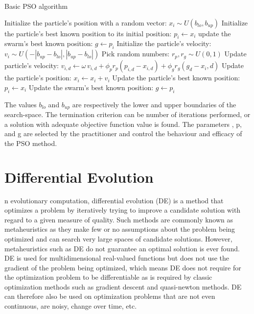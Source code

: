 \documentclass[11pt, a4paper]{report}
\begin{document}
\begin{algorithm}
	\caption{Basic PSO algorithm}\label{algo:pso}
	\begin{algorithmic}[1]
		\State Initialize the particle's position with a random vector: $ x_{i} \sim U(b_{lo}, b_{up}) $
		\State Initialize the particle's best known position to its initial position: $ p_{i} \gets x_{i} $
		\State update the swarm's best known  position: $ g \gets p_{i} $
		\EndIf
		\State Initialize the particle's velocity: $ v_{i} \sim  U(-|b_{up}-b_{lo}|, |b_{up}-b_{lo}|) $
		\State Pick random numbers: $ r_{p}, r_{g} \sim U(0,1) $
		\State          Update particle's velocity: $ v_{i,d} \gets \omega\, v_{i,d} + \phi_{p} r_{p} (p_{i,d}-x_{i,d}) + \phi_{g} r_{g} (g_{d}-x_{i},d) $
		\State Update the particle's position: $ x_{i} \gets x_{i} + v_{i} $
		\State Update the particle's best known position: $ p_{i} ← x_{i} $
		\State Update the swarm's best known position: $ g \gets p_{i} $
		\EndIf
		\EndIf
		\EndFor
		\EndFor
		\EndWhile
		\EndFor
	\end{algorithmic}
\end{algorithm}

The values $ b_{lo} $ and $ b_{up} $ are respectively the lower and upper boundaries of the search-space. The termination criterion can be number of iterations performed, or a solution with adequate objective function value is found. The parameters \omega, \phi p, and \phi g are selected by the practitioner and control the behaviour and efficacy of the PSO method. \cite{wiki:pso}
\newpage


\section{Differential Evolution}
n evolutionary computation, differential evolution (DE) is a method that optimizes a problem by iteratively trying to improve a candidate solution with regard to a given measure of quality. Such methods are commonly known as metaheuristics as they make few or no assumptions about the problem being optimized and can search very large spaces of candidate solutions. However, metaheuristics such as DE do not guarantee an optimal solution is ever found. \\

DE is used for multidimensional real-valued functions but does not use the gradient of the problem being optimized, which means DE does not require for the optimization problem to be differentiable as is required by classic optimization methods such as gradient descent and quasi-newton methods. DE can therefore also be used on optimization problems that are not even continuous, are noisy, change over time, etc. \\
\end{document}
